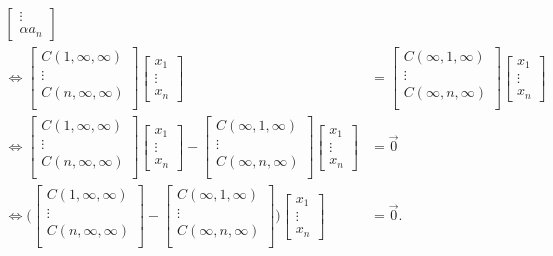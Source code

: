 \documentclass[../thesis.tex]{subfiles}
\begin{document}
\begin{align}
\begin{bmatrix}
    \vdots\\
    \alpha a_n
\end{bmatrix}\\
\iff \begin{bmatrix} 
    C(1,\infty,\infty)\\
    \vdots\\
    C(n,\infty,\infty)\\
    \end{bmatrix}   
\begin{bmatrix}
    x_1\\ \vdots\\ x_n
\end{bmatrix}
&= 
\begin{bmatrix} 
    C(\infty,1,\infty)\\
    \vdots\\
    C(\infty,n,\infty)\\
    \end{bmatrix}
\begin{bmatrix}
    x_1\\ \vdots\\ x_n
\end{bmatrix}\nonumber\\
\iff\begin{bmatrix} 
    C(1,\infty,\infty)\\
    \vdots\\
    C(n,\infty,\infty)\\
    \end{bmatrix}
\begin{bmatrix}
    x_1\\ \vdots\\ x_n
\end{bmatrix}
-
\begin{bmatrix} 
    C(\infty,1,\infty)\\
    \vdots\\
    C(\infty,n,\infty)\\
    \end{bmatrix}
\begin{bmatrix}
    x_1\\ \vdots\\ x_n
\end{bmatrix}
&= \Vec{0}\nonumber\\
\iff\Bigg(
\begin{bmatrix} 
    C(1,\infty,\infty)\\
    \vdots\\
    C(n,\infty,\infty)\\
    \end{bmatrix}
-
\begin{bmatrix} 
    C(\infty,1,\infty)\\
    \vdots\\
    C(\infty,n,\infty)\\
    \end{bmatrix}\Bigg)
\begin{bmatrix}
    x_1\\ \vdots\\ x_n
\end{bmatrix}
&= \Vec{0}.\nonumber
\end{align}
\end{document}
